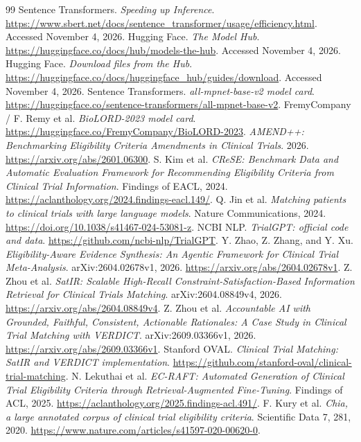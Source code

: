 \documentclass[10pt,letterpaper]{article}
\begin{document}
\clearpage
\begin{thebibliography}{99}
 Sentence Transformers. \emph{Speeding up Inference}.
\url{https://www.sbert.net/docs/sentence_transformer/usage/efficiency.html}.
Accessed November 4, 2026.
 Hugging Face. \emph{The Model Hub}.
\url{https://huggingface.co/docs/hub/models-the-hub}. Accessed November 4, 2026.
 Hugging Face. \emph{Download files from the Hub}.
\url{https://huggingface.co/docs/huggingface_hub/guides/download}. Accessed November 4, 2026.
 Sentence Transformers. \emph{all-mpnet-base-v2 model card}.
\url{https://huggingface.co/sentence-transformers/all-mpnet-base-v2}.
 FremyCompany / F. Remy et al. \emph{BioLORD-2023 model card}.
\url{https://huggingface.co/FremyCompany/BioLORD-2023}.
 \emph{AMEND++: Benchmarking Eligibility Criteria Amendments in Clinical Trials}.
2026. \url{https://arxiv.org/abs/2601.06300}.
 S. Kim et al. \emph{CReSE: Benchmark Data and Automatic Evaluation Framework for Recommending Eligibility Criteria from Clinical Trial Information}.
Findings of EACL, 2024. \url{https://aclanthology.org/2024.findings-eacl.149/}.
 Q. Jin et al. \emph{Matching patients to clinical trials with large language models}.
Nature Communications, 2024. \url{https://doi.org/10.1038/s41467-024-53081-z}.
 NCBI NLP. \emph{TrialGPT: official code and data}.
\url{https://github.com/ncbi-nlp/TrialGPT}.
 Y. Zhao, Z. Zhang, and Y. Xu.
\emph{Eligibility-Aware Evidence Synthesis: An Agentic Framework for Clinical Trial Meta-Analysis}.
arXiv:2604.02678v1, 2026. \url{https://arxiv.org/abs/2604.02678v1}.
 Z. Zhou et al. \emph{SatIR: Scalable High-Recall Constraint-Satisfaction-Based Information Retrieval for Clinical Trials Matching}.
arXiv:2604.08849v4, 2026. \url{https://arxiv.org/abs/2604.08849v4}.
 Z. Zhou et al. \emph{Accountable AI with Grounded, Faithful, Consistent, Actionable Rationales: A Case Study in Clinical Trial Matching with VERDICT}.
arXiv:2609.03366v1, 2026. \url{https://arxiv.org/abs/2609.03366v1}.
 Stanford OVAL. \emph{Clinical Trial Matching: SatIR and VERDICT implementation}.
\url{https://github.com/stanford-oval/clinical-trial-matching}.
 N. Lekuthai et al. \emph{EC-RAFT: Automated Generation of Clinical Trial Eligibility Criteria through Retrieval-Augmented Fine-Tuning}.
Findings of ACL, 2025. \url{https://aclanthology.org/2025.findings-acl.491/}.
 F. Kury et al. \emph{Chia, a large annotated corpus of clinical trial eligibility criteria}.
Scientific Data 7, 281, 2020. \url{https://www.nature.com/articles/s41597-020-00620-0}.
\end{thebibliography}
\end{document}
